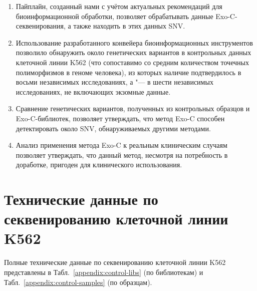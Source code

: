 \documentclass[a4paper,14pt]{extarticle}
\newcommand{\thousands}{тыс.}
\newcommand{\mln}{млн}
\newcommand{\tableref}[1]{Табл.~\ref{#1}}
\begin{document}
\begin{enumerate}
	\item Пайплайн, созданный нами с учётом актуальных рекомендаций для биоинформационной обработки, позволяет обрабатывать данные Exo-C\hyp{}секвенирования, а также находить в этих данных SNV.
	\item Использование разработанного конвейера биоинформационных инструментов позволило обнаружить около \numprint[\mln]{5.5} генетических вариантов в контрольных данных клеточной линии K562 (что сопоставимо со средним количеством точечных полиморфизмов в геноме человека), из которых наличие \numprint[\thousands]{75} подтвердилось в восьми независимых исследованиях, а \numprint[\mln]{1} "--- в шести независимых исследованиях, не включающих экзомные данные.
	\item Сравнение генетических вариантов, полученных из контрольных образцов и Exo-C\hyp{}библиотек, позволяет утверждать, что метод Exo-C способен детектировать около  SNV, обнаруживаемых другими методами.
	\item Анализ применения метода Exo-C к реальным клиническим случаям позволяет утверждать, что данный метод, несмотря на потребность в доработке, пригоден для клинического использования.
\end{enumerate}

\newpage

\renewcommand\refname{Список литературы}

\newpage

\appendix
{}
\section{\label{appendix:sequence-stats}Технические данные по секвенированию клеточной линии K562}

Полные технические данные по секвенированию клеточной линии K562 представлены в \tableref{appendix:control-libs} (по библиотекам) и \tableref{appendix:control-samples} (по образцам).
\end{document}
